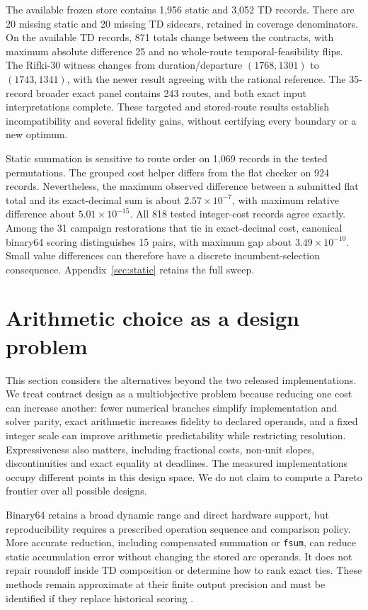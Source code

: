 \documentclass[11pt]{article}
\begin{document}
The available frozen store contains 1,956 static and 3,052 TD records. There are 20 missing static and 20 missing TD sidecars, retained in coverage denominators. On the available TD records, 871 totals change between the contracts, with maximum absolute difference 25 and no whole-route temporal-feasibility flips. The Rifki-30 witness changes from duration/departure $(1768,1301)$ to $(1743,1341)$, with the newer result agreeing with the rational reference. The 35-record broader exact panel contains 243 routes, and both exact input interpretations complete. These targeted and stored-route results establish incompatibility and several fidelity gains, without certifying every boundary or a new optimum.

Static summation is sensitive to route order on 1,069 records in the tested permutations. The grouped cost helper differs from the flat checker on 924 records. Nevertheless, the maximum observed difference between a submitted flat total and its exact-decimal sum is about $2.57\times10^{-7}$, with maximum relative difference about $5.01\times10^{-15}$. All 818 tested integer-cost records agree exactly. Among the 31 campaign restorations that tie in exact-decimal cost, canonical binary64 scoring distinguishes 15 pairs, with maximum gap about $3.49\times10^{-10}$. Small value differences can therefore have a discrete incumbent-selection consequence. Appendix~\ref{sec:static} retains the full sweep.



\section{Arithmetic choice as a design problem}\label{sec:alternatives}

This section considers the alternatives beyond the two released implementations. We treat contract design as a multiobjective problem because reducing one cost can increase another: fewer numerical branches simplify implementation and solver parity, exact arithmetic increases fidelity to declared operands, and a fixed integer scale can improve arithmetic predictability while restricting resolution. Expressiveness also matters, including fractional costs, non-unit slopes, discontinuities and exact equality at deadlines. The measured implementations occupy different points in this design space. We do not claim to compute a Pareto frontier over all possible designs.

Binary64 retains a broad dynamic range and direct hardware support, but reproducibility requires a prescribed operation sequence and comparison policy. More accurate reduction, including compensated summation or \texttt{fsum}, can reduce static accumulation error without changing the stored arc operands. It does not repair roundoff inside TD composition or determine how to rank exact ties. These methods remain approximate at their finite output precision and must be identified if they replace historical scoring \autocite{goldbergFloatingPoint1991,ogitaAccurateSum2005,pythonFsum2026}.
\end{document}
